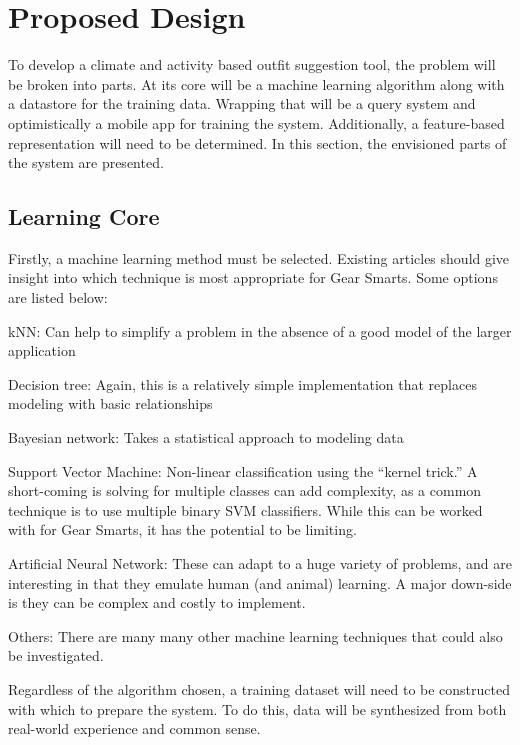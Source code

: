 \section{Proposed Design}
\label{section:propeseddesign}
To develop a climate and activity based outfit suggestion tool, the problem will be broken into parts.
At its core will be a machine learning algorithm along with a datastore for the training data. Wrapping that will
be a query system and optimistically a mobile app for training the system. Additionally, a feature-based representation
will need to be determined. In this section, the envisioned parts of the system are presented.

\subsection{Learning Core}
Firstly, a machine learning method must be selected. Existing articles should give insight into which technique is
most appropriate for Gear Smarts. Some options are listed below:

\begin{description}
  \item{kNN:} Can help to simplify a problem in the absence of a good model of the larger application
  \item{Decision tree:} Again, this is a relatively simple implementation that replaces modeling with basic relationships
  \item{Bayesian network:} Takes a statistical approach to modeling data
  \item{Support Vector Machine:} Non-linear classification using the ``kernel trick.'' A short-coming is solving for multiple
  classes can add complexity, as a common technique is to use multiple binary SVM classifiers. While this can be worked with
  for Gear Smarts, it has the potential to be limiting.
  \item{Artificial Neural Network:} These can adapt to a huge variety of problems, and are interesting in that they emulate
  human (and animal) learning. A major down-side is they can be complex and costly to implement.
  \item{Others:} There are many many other machine learning techniques that could also be investigated.
\end{description}

Regardless of the algorithm chosen, a training dataset will need to be constructed with which to prepare the system. To do this,
data will be synthesized from both real-world experience and common sense.

